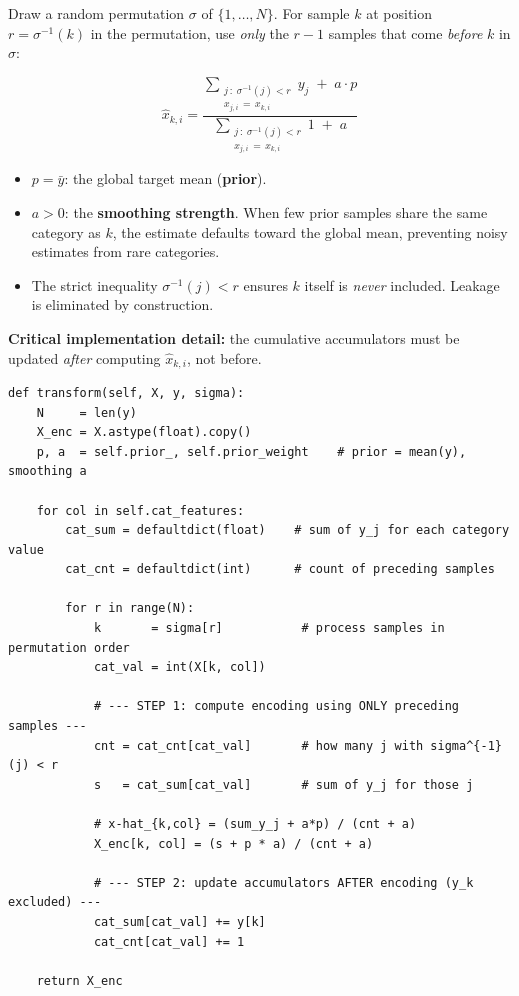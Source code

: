 \documentclass[11pt, a4paper]{article}
\begin{document}
Draw a random permutation $\sigma$ of $\{1,\ldots,N\}$.
For sample $k$ at position $r = \sigma^{-1}(k)$ in the permutation,
use \emph{only} the $r-1$ samples that come \emph{before} $k$ in $\sigma$:

\[
\hat{x}_{k,i} =
\frac{\displaystyle\sum_{\substack{j\,:\;\sigma^{-1}(j) < r \\ x_{j,i}\,=\,x_{k,i}}} y_j
      \;+\; a\cdot p}
{\displaystyle\sum_{\substack{j\,:\;\sigma^{-1}(j) < r \\ x_{j,i}\,=\,x_{k,i}}} 1
      \;+\; a}
\]

\begin{itemize}
  \item $p = \bar{y}$: the global target mean (\textbf{prior}).
  \item $a > 0$: the \textbf{smoothing strength}. When few prior samples
    share the same category as $k$, the estimate defaults toward the
    global mean, preventing noisy estimates from rare categories.
  \item The strict inequality $\sigma^{-1}(j) < r$ ensures $k$ itself
    is \emph{never} included. Leakage is eliminated by construction.
\end{itemize}

\textbf{Critical implementation detail:} the cumulative accumulators
must be updated \emph{after} computing $\hat{x}_{k,i}$, not before.

\begin{listing}[H]
\caption{Ordered TS transform (\texttt{encoder.py})}
\begin{verbatim}
def transform(self, X, y, sigma):
    N     = len(y)
    X_enc = X.astype(float).copy()
    p, a  = self.prior_, self.prior_weight    # prior = mean(y), smoothing a

    for col in self.cat_features:
        cat_sum = defaultdict(float)    # sum of y_j for each category value
        cat_cnt = defaultdict(int)      # count of preceding samples

        for r in range(N):
            k       = sigma[r]           # process samples in permutation order
            cat_val = int(X[k, col])

            # --- STEP 1: compute encoding using ONLY preceding samples ---
            cnt = cat_cnt[cat_val]       # how many j with sigma^{-1}(j) < r
            s   = cat_sum[cat_val]       # sum of y_j for those j

            # x-hat_{k,col} = (sum_y_j + a*p) / (cnt + a)
            X_enc[k, col] = (s + p * a) / (cnt + a)

            # --- STEP 2: update accumulators AFTER encoding (y_k excluded) ---
            cat_sum[cat_val] += y[k]
            cat_cnt[cat_val] += 1

    return X_enc
\end{verbatim}
\end{listing}
\end{document}

